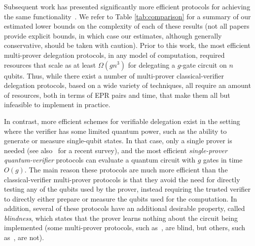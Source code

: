 \documentclass[11pt,letter]{article}
\theoremstyle{remark}
\theoremstyle{definition}
\begin{document}
Subsequent work has presented significantly more efficient protocols for achieving the same functionality~\cite{McKague16,Gheorghiu15,hajdusek2015,%
hajdusek2015posthoc,natarajan2016robust}. We refer to Table \ref{tab:comparison} for a summary of our estimated lower bounds on the complexity of each of these results (not all papers provide explicit bounds, in which case our estimates, although generally conservative, should be taken with caution). Prior to this work, the most efficient multi-prover delegation protocols, in any model of computation, required resources that scale as at least $\Omega(gn^3)$ for delegating a $g$-gate circuit on $n$ qubits. 
Thus, while there exist a number of multi-prover classical-verifier delegation protocols, based on a wide variety of techniques, all require an amount of resources, both in terms of EPR pairs and time, that make them all but infeasible to implement in practice. 

In contrast, more efficient schemes for verifiable delegation exist in the setting where the verifier has some limited quantum power, such as the ability to generate or measure single-qubit states. In that case, only a single prover is needed \cite{aharonov10qpip,fitzsimons12vubqc,Morimae14,broadbent15howtoverify,MF16} (see also~\cite{fitzsimons2016survey} for a recent survey), and the most efficient \emph{single-prover quantum-verifier} protocols can evaluate a quantum circuit with $g$ gates in time $O(g)$. The main reason these protocols are much more efficient than the classical-verifier multi-prover protocols is that they avoid the need for directly testing any of the qubits used by the prover, instead requiring the trusted verifier to directly either prepare or measure the qubits used for the computation. In addition, several of these protocols have an additional desirable property, called \emph{blindness}, which states that the prover learns nothing about the circuit being implemented (some multi-prover protocols, such as~\cite{reichardt2012classical}, are blind, but others, such as~\cite{hajdusek2015posthoc}, are not). 
\end{document}
